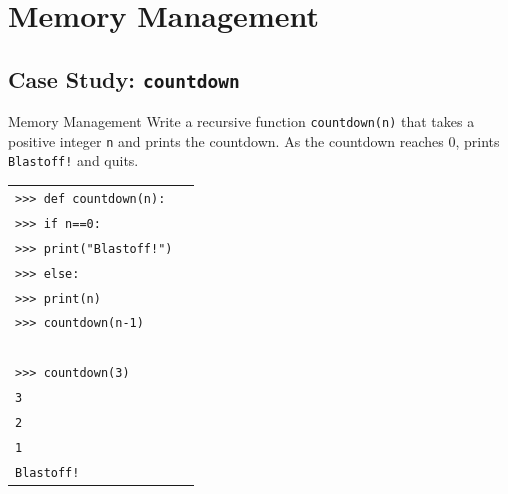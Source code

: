 \documentclass[t,handout,9pt]{beamer}
\begin{document}
\section{Memory Management}
\subsection{Case Study: \texttt{countdown}}
\begin{frame}{Memory Management}
\vfill
Write a recursive function \texttt{countdown(n)} that takes a positive integer \texttt{n} and prints the countdown. As the countdown reaches 0, prints \texttt{Blastoff!} and quits.
\begin{table}[]
\begin{flushleft}
\begin{tabular}{ll}
\texttt{>{}>{}> def countdown(n):} &  \\
\texttt{>{}>{}> \qquad if n==0:} &  \\
\texttt{>{}>{}> \qquad\qquad print("Blastoff!")} &  \\
\texttt{>{}>{}> \qquad else:} &  \\
\texttt{>{}>{}> \qquad\qquad print(n)} &  \\
\texttt{>{}>{}> \qquad\qquad countdown(n-1)} &  \\
\texttt{ } &  \\
\texttt{>{}>{}> countdown(3)} &  \\
\texttt{3} &  \\
\texttt{2} &  \\
\texttt{1} &  \\
\texttt{Blastoff!} &  \\
\end{tabular}
\end{flushleft}
\end{table}
\vfill
\end{frame}
%
\end{document}
